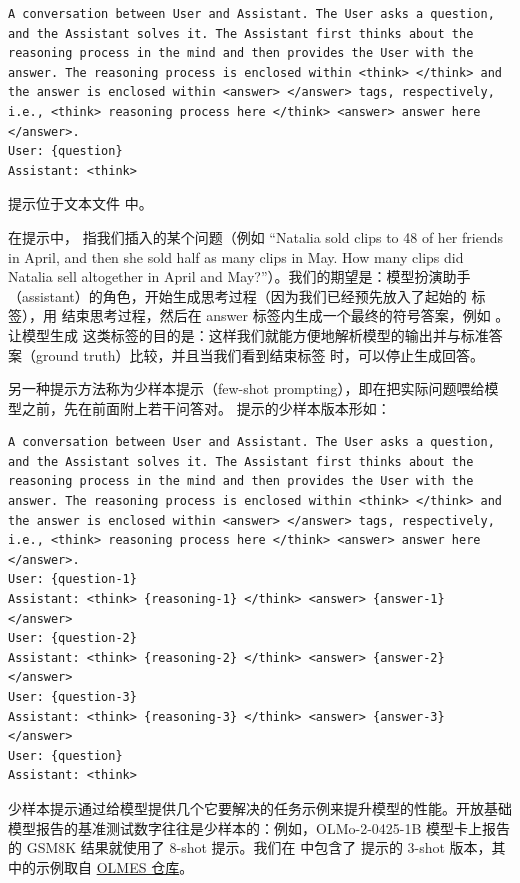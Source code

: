\begin{lstlisting}
A conversation between User and Assistant. The User asks a question, and the Assistant solves it. The Assistant first thinks about the reasoning process in the mind and then provides the User with the answer. The reasoning process is enclosed within <think> </think> and the answer is enclosed within <answer> </answer> tags, respectively, i.e., <think> reasoning process here </think> <answer> answer here </answer>.
User: {question}
Assistant: <think>
\end{lstlisting}

 提示位于文本文件  中。

在提示中， 指我们插入的某个问题（例如 “Natalia sold clips to 48 of her friends in April, and then she sold half as many clips in May. How many clips did Natalia sell altogether in April and May?”）。我们的期望是：模型扮演助手（assistant）的角色，开始生成思考过程（因为我们已经预先放入了起始的  标签），用  结束思考过程，然后在 answer 标签内生成一个最终的符号答案，例如 。让模型生成  这类标签的目的是：这样我们就能方便地解析模型的输出并与标准答案（ground truth）比较，并且当我们看到结束标签  时，可以停止生成回答。

另一种提示方法称为少样本提示（few-shot prompting），即在把实际问题喂给模型之前，先在前面附上若干问答对。 提示的少样本版本形如：

\begin{lstlisting}
A conversation between User and Assistant. The User asks a question, and the Assistant solves it. The Assistant first thinks about the reasoning process in the mind and then provides the User with the answer. The reasoning process is enclosed within <think> </think> and the answer is enclosed within <answer> </answer> tags, respectively, i.e., <think> reasoning process here </think> <answer> answer here </answer>.
User: {question-1}
Assistant: <think> {reasoning-1} </think> <answer> {answer-1} </answer>
User: {question-2}
Assistant: <think> {reasoning-2} </think> <answer> {answer-2} </answer>
User: {question-3}
Assistant: <think> {reasoning-3} </think> <answer> {answer-3} </answer>
User: {question}
Assistant: <think>
\end{lstlisting}

少样本提示通过给模型提供几个它要解决的任务示例来提升模型的性能。开放基础模型报告的基准测试数字往往是少样本的：例如，OLMo-2-0425-1B 模型卡上报告的 GSM8K 结果就使用了 8-shot 提示。我们在  中包含了  提示的 3-shot 版本，其中的示例取自 \href{https://github.com/allenai/olmes/blob/main/oe_eval/tasks/fewshot_sources.py#L2247}{OLMES 仓库}。

